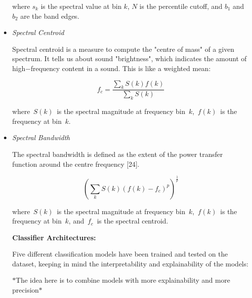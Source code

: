 \documentclass[11pt]{article}
\begin{document}
\begin{itemize}
\vspace{1\baselineskip}
where \( s_{k}\) is the spectral value at bin \( k\), \( N\) is the percentile cutoff, and \( b_{1}\) and \( b_{2}\) are the band edges.

\vspace{1\baselineskip}
	\item \textit{Spectral Centroid}

Spectral centroid is a measure to compute the "centre of mass" of a given spectrum. It tells us about sound "brightness", which indicates the amount of high$-$frequency content in a sound. This is like a weighted mean:

\vspace{1\baselineskip}
\begin{equation}
f_{c} =\frac{\sum_{k}^{} S(k)f(k)}{\sum_{k}^{} S(k)}
\end{equation}


\vspace{1\baselineskip}
where \( S(k)\) is the spectral magnitude at frequency bin \( k\), \( f(k)\) is the frequency at bin \( k\).

\vspace{1\baselineskip}
	\item \textit{Spectral Bandwidth}

The spectral bandwidth is defined as the extent of the power transfer function around the centre frequency [24]. 

\vspace{1\baselineskip}
\begin{equation}
\left(\sum_{k}^{} S(k)\left(f(k) - f_{c}\right)^{p}\right)^{\frac{1}{p}}
\end{equation}


\vspace{1\baselineskip}
where \( S(k)\) is the spectral magnitude at frequency bin \( k\), \( f(k)\) is the frequency at bin \( k\), and \( f_{c}\) is the spectral centroid.

\vspace{3\baselineskip}
{\Large \textbf{Classifier Architectures:}}

\vspace{1\baselineskip}
Five different classification models have been trained and tested on the dataset, keeping in mind the interpretability and explainability of the models:

\vspace{1\baselineskip}
$\ast$The idea here is to combine models with more explainability and more precision$\ast$


\end{itemize}
\end{document}
